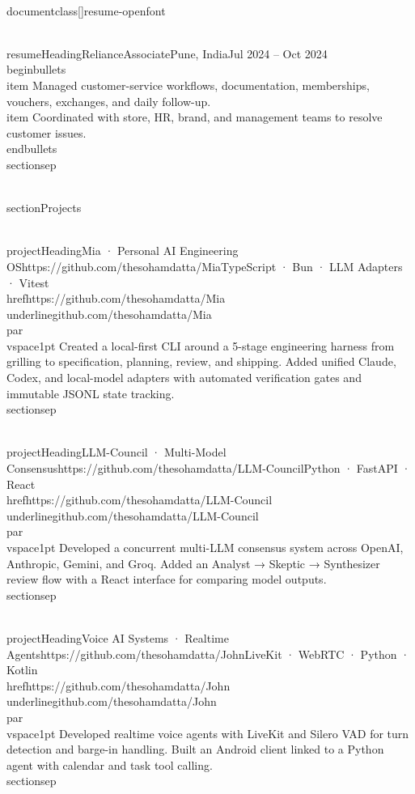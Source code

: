 \\documentclass[]{resume-openfont}
\begin{document}
\\resumeHeading{Reliance}{Associate}{Pune, India}{Jul 2024 – Oct 2024}
\\begin{bullets}
    \\item Managed customer-service workflows, documentation, memberships, vouchers, exchanges, and daily follow-up.
    \\item Coordinated with store, HR, brand, and management teams to resolve customer issues.
\\end{bullets}
\\sectionsep

\\section{Projects}

\\projectHeading{Mia · Personal AI Engineering OS}{https://github.com/thesohamdatta/Mia}{TypeScript · Bun · LLM Adapters · Vitest}
\\href{https://github.com/thesohamdatta/Mia}{\\underline{github.com/thesohamdatta/Mia}}\\par\\vspace{1pt}
Created a local-first CLI around a 5-stage engineering harness from grilling to specification, planning, review, and shipping. Added unified Claude, Codex, and local-model adapters with automated verification gates and immutable JSONL state tracking.
\\sectionsep

\\projectHeading{LLM-Council · Multi-Model Consensus}{https://github.com/thesohamdatta/LLM-Council}{Python · FastAPI · React}
\\href{https://github.com/thesohamdatta/LLM-Council}{\\underline{github.com/thesohamdatta/LLM-Council}}\\par\\vspace{1pt}
Developed a concurrent multi-LLM consensus system across OpenAI, Anthropic, Gemini, and Groq. Added an Analyst → Skeptic → Synthesizer review flow with a React interface for comparing model outputs.
\\sectionsep

\\projectHeading{Voice AI Systems · Realtime Agents}{https://github.com/thesohamdatta/John}{LiveKit · WebRTC · Python · Kotlin}
\\href{https://github.com/thesohamdatta/John}{\\underline{github.com/thesohamdatta/John}}\\par\\vspace{1pt}
Developed realtime voice agents with LiveKit and Silero VAD for turn detection and barge-in handling. Built an Android client linked to a Python agent with calendar and task tool calling.
\\sectionsep
\end{document}
